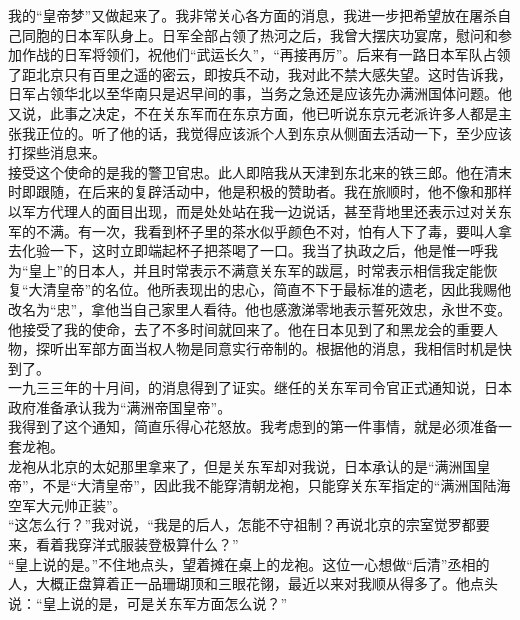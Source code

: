 我的“皇帝梦”又做起来了。我非常关心各方面的消息，我进一步把希望放在屠杀自己同胞的日本军队身上。日军全部占领了热河之后，我曾大摆庆功宴席，慰问和参加作战的日军将领们，祝他们“武运长久”，“再接再厉”。后来有一路日本军队占领了距北京只有百里之遥的密云，即按兵不动，我对此不禁大感失望。这时告诉我，日军占领华北以至华南只是迟早间的事，当务之急还是应该先办满洲国体问题。他又说，此事之决定，不在关东军而在东京方面，他已听说东京元老派许多人都是主张我正位的。听了他的话，我觉得应该派个人到东京从侧面去活动一下，至少应该打探些消息来。\\

接受这个使命的是我的警卫官忠。此人即陪我从天津到东北来的铁三郎。他在清末时即跟随，在后来的复辟活动中，他是积极的赞助者。我在旅顺时，他不像和那样以军方代理人的面目出现，而是处处站在我一边说话，甚至背地里还表示过对关东军的不满。有一次，我看到杯子里的茶水似乎颜色不对，怕有人下了毒，要叫人拿去化验一下，这时立即端起杯子把茶喝了一口。我当了执政之后，他是惟一呼我为“皇上”的日本人，并且时常表示不满意关东军的跋扈，时常表示相信我定能恢复“大清皇帝”的名位。他所表现出的忠心，简直不下于最标准的遗老，因此我赐他改名为“忠”，拿他当自己家里人看待。他也感激涕零地表示誓死效忠，永世不变。他接受了我的使命，去了不多时间就回来了。他在日本见到了和黑龙会的重要人物，探听出军部方面当权人物是同意实行帝制的。根据他的消息，我相信时机是快到了。\\

一九三三年的十月间，的消息得到了证实。继任的关东军司令官正式通知说，日本政府准备承认我为“满洲帝国皇帝”。\\

我得到了这个通知，简直乐得心花怒放。我考虑到的第一件事情，就是必须准备一套龙袍。\\

龙袍从北京的太妃那里拿来了，但是关东军却对我说，日本承认的是“满洲国皇帝”，不是“大清皇帝”，因此我不能穿清朝龙袍，只能穿关东军指定的“满洲国陆海空军大元帅正装”。\\

“这怎么行？”我对说，“我是的后人，怎能不守祖制？再说北京的宗室觉罗都要来，看着我穿洋式服装登极算什么？”\\

“皇上说的是。”不住地点头，望着摊在桌上的龙袍。这位一心想做“后清”丞相的人，大概正盘算着正一品珊瑚顶和三眼花翎，最近以来对我顺从得多了。他点头说：“皇上说的是，可是关东军方面怎么说？”\\

